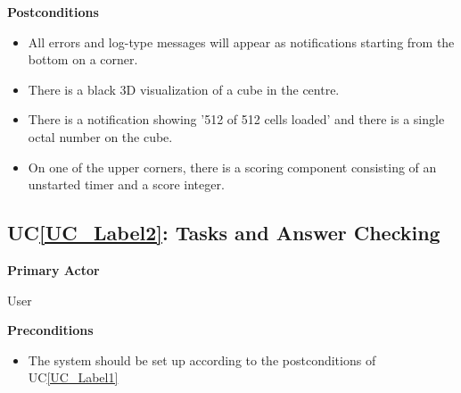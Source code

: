 \documentclass[12pt]{article}
\newcounter{ucnum} %
\newcommand{\ucref}[1]{UC\ref{#1}}
\begin{document}
\textbf{Postconditions}
\begin{itemize}
\item All errors and log-type messages will appear as notifications starting from the bottom on a corner.
\item There is a black 3D visualization of a cube in the centre.
\item There is a notification showing '512 of 512 cells loaded' and there is a single octal number on the cube.
\item On one of the upper corners, there is a scoring component consisting of an unstarted timer and a score integer.
\end{itemize}

 \label{UC_Label2}
\subsection{\ucref{UC_Label2}: Tasks and Answer Checking}

\textbf{Primary Actor}

User

\textbf{Preconditions}
\begin{itemize}
\item The system should be set up according to the postconditions of \ucref{UC_Label1}
\end{itemize}
\end{document}
